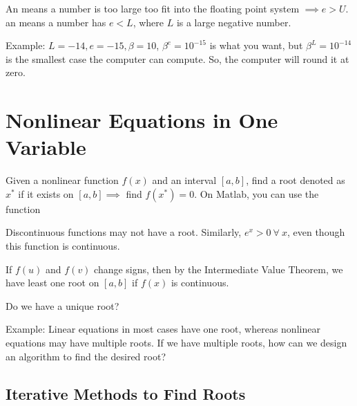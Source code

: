 \documentclass[12pt]{scrartcl}
\begin{document}
\begin{definition}
  An  means a number is too large too fit into the floating point system $\implies e > U$. 
  an  means a number has $e < L$, where $L$ is a large negative number. 

  Example: $L = -14, e = -15, \beta = 10$, $\beta^e = 10^{-15}$ is what you want, but
  $\beta^L = 10^{-14}$ is the smallest case the computer can compute. So, the computer will round it at zero. 
\end{definition}

\section{Nonlinear Equations in One Variable}

\begin{definition}
  Given a nonlinear function $f(x)$ and an interval $[a,b]$, find a root 
  denoted as $x^*$ if it exists on $[a,b] \implies$ find $f(x^*) = 0$. On Matlab, you can use the 
   function
\end{definition}

\begin{note}
  Discontinuous functions may not have a root. Similarly, $e^x > 0 \ \forall \ x$, even though this 
  function is continuous.
\end{note}

\begin{note}
  If $f(u)$ and $f(v)$ change signs, then by the Intermediate Value Theorem, we have least one root on $[a,b]$ if 
  $f(x)$ is continuous. 
\end{note}

\begin{definition}
  Do we have a unique root? 

  Example: Linear equations in most cases have one root, whereas nonlinear equations may have multiple roots.
  If we have multiple roots, how can we design an algorithm to find the desired root?
\end{definition}

\subsection{Iterative Methods to Find Roots}
\end{document}
